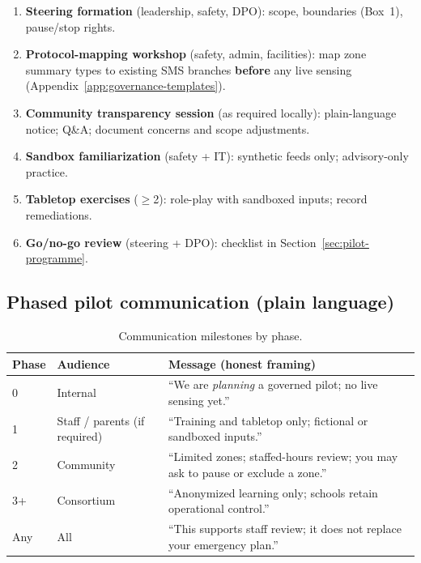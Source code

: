 \begin{enumerate}[noitemsep]
  \item \textbf{Steering formation} (leadership, safety, DPO): scope, boundaries (Box~1), pause/stop rights.
  \item \textbf{Protocol-mapping workshop} (safety, admin, facilities): map zone summary types to
        existing SMS branches \textbf{before} any live sensing (Appendix~\ref{app:governance-templates}).
  \item \textbf{Community transparency session} (as required locally): plain-language notice; Q\&A;
        document concerns and scope adjustments.
  \item \textbf{Sandbox familiarization} (safety + IT): synthetic feeds only; advisory-only practice.
  \item \textbf{Tabletop exercises} ($\geq$2): role-play with sandboxed inputs; record remediations.
  \item \textbf{Go/no-go review} (steering + DPO): checklist in Section~\ref{sec:pilot-programme}.
\end{enumerate}

\subsection{Phased pilot communication (plain language)}

\begin{table}[htbp]
  \centering
  \caption{Communication milestones by phase.}
  \label{tab:phased-comms}
  \small
  \begin{tabular}{@{}p{1.2cm}p{2.6cm}p{5.2cm}@{}}
    \toprule
    Phase & Audience & Message (honest framing) \\
    \midrule
    0 & Internal & ``We are \emph{planning} a governed pilot; no live sensing yet.'' \\
    1 & Staff / parents (if required) & ``Training and tabletop only; fictional or sandboxed inputs.'' \\
    2 & Community & ``Limited zones; staffed-hours review; you may ask to pause or exclude a zone.'' \\
    3+ & Consortium & ``Anonymized learning only; schools retain operational control.'' \\
    Any & All & ``This supports staff review; it does not replace your emergency plan.'' \\
    \bottomrule
  \end{tabular}
\end{table}


